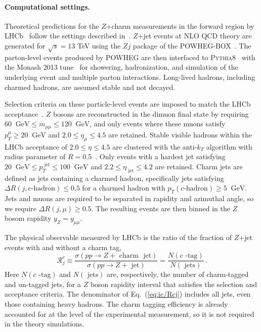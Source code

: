 \paragraph{Computational settings.}
%
Theoretical predictions for
the $Z$+charm measurements in the forward region 
by LHCb~\cite{LHCb:2021stx} follow the 
 settings described in~\cite{Boettcher:2015sqn}.
%
$Z$+jet events at NLO QCD theory are generated for $\sqrt{s}= 13$ TeV  using the $Zj$ package of the
\textsc{\small POWHEG-BOX}~\cite{Alioli:2010xd}.
%
The parton-level events produced by \textsc{\small POWHEG}
are then interfaced to \textsc{\small Pythia8}~\cite{Sjostrand:2007gs}
with the Monash 2013 tune~\cite{Skands:2014pea} for showering,
hadronization, and simulation of the underlying event and multiple
parton interactions.
%
Long-lived hadrons, including charmed hadrons,
are assumed stable and not decayed.

Selection criteria on these particle-level events are imposed
to match the LHCb acceptance~\cite{LHCb:2021stx}.
%
$Z$ bosons are reconstructed in the dimuon final state by
requiring $60~\textrm{ GeV}\le m_{\mu\mu} \le 120~\textrm{ GeV}$,
and
only events where these muons satisfy
    $p_T^\mu \ge 20~\textrm{ GeV}$ and $2.0 \le \eta_{\mu}\le 4.5$
    are retained.
%
Stable visible hadrons within the LHCb acceptance of
$2.0 \le \eta \le 4.5$ are clustered with
the anti-$k_T$ algorithm with radius parameter
of $R=0.5$~\cite{Cacciari:2008gp}.
%
Only events with a hardest jet satisfying
  $ 20~\textrm{ GeV} \le p_T^\textrm{ jet} \le 100~\textrm{ GeV}$
and $2.2 \le \eta_\textrm{ jet}\le 4.2$ are retained.
%
Charm jets are defined as jets containing
a charmed hadron, specifically  jets satisfying
$\Delta R(j, c\textrm{-hadron})\le 0.5$ for a charmed
hadron with $p_T(c\textrm{-hadron})\ge 5~\textrm{ GeV}$.
%
Jets and muons are required to be separated
in rapidity and azimuthal angle, so
we require $\Delta R(j, \mu)\ge 0.5$.
%
The resulting events
are then binned in the $Z$ bosom rapidity $y_Z = y_{\mu \mu}$.

The physical observable measured by LHCb is the ratio of the fraction of $Z$+jet
    events with and without a charm tag,
    \begin{equation}
    \label{eq:ic/Rcj}
        \mathcal{R}_j^c \equiv \frac{\sigma(pp\to Z+\textrm{ charm~ jet})}{\sigma(pp \to Z+\textrm{ jet})}=
         \frac{N(c\textrm{ -tag})}{ 
        N(\textrm{ jets})} \, .
    \end{equation}
 Here  $N(c\textrm{ -tag})$ and $N(\textrm{ jets})$ are, respectively, the number
    of charm-tagged and un-tagged jets, for a  $Z$ boson rapidity interval
    that satisfies the selection and acceptance criteria.
    The denominator of Eq.~(\ref{eq:ic/Rcj}) includes all jets, even those
    containing heavy hadrons.
The charm tagging efficiency is already accounted for at the level
of the experimental measurement, so it is not required in the theory
simulations.

